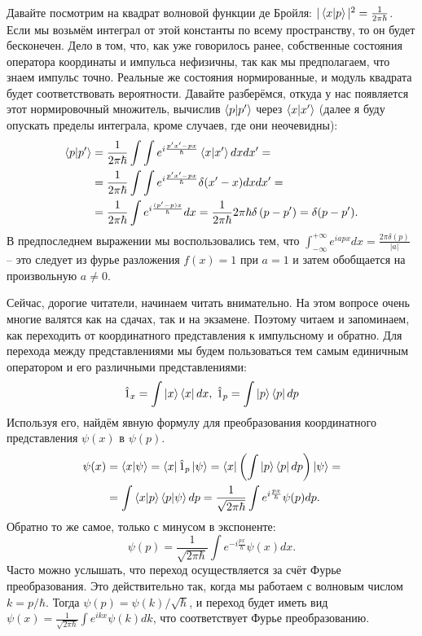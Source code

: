 Давайте посмотрим на квадрат волновой функции де Бройля: $|\bra{x} \ket{p}|^2 = \frac{1}{2 \pi \hbar}$. Если мы возьмём интеграл от этой константы по всему пространству, то он будет бесконечен. Дело в том, что, как уже говорилось ранее, собственные состояния оператора координаты и импульса нефизичны, так как мы предполагаем, что знаем импульс точно. Реальные же состояния нормированные, и модуль квадрата будет соответствовать вероятности. Давайте разберёмся, откуда у нас появляется этот нормировочный множитель, вычислив $\bra{p}\ket{p'}$ через $\bra{x}\ket{x'}$ (далее я буду опускать пределы интеграла, кроме случаев, где они неочевидны):
\begin{align*}
    \bra{p} \ket{p'} &= \frac{1}{2 \pi \hbar} \int \int e^{i \frac{p'x' - px}{\hbar}} \bra{x} \ket{x'} dx dx' = \\
    &= \frac{1}{2 \pi \hbar} \int \int e^{i \frac{p'x' - px}{\hbar}} \delta(x' - x) dx dx' =\\ 
    &= \frac{1}{2 \pi \hbar}\int e^{i \frac{(p' - p) x}{\hbar}}dx = \frac{1}{2 \pi \hbar} 2 \pi \hbar \delta\left(p - p'\right) = \delta(p - p').
\end{align*}
В предпоследнем выражении мы воспользовались тем, что $\int_{-\infty}^{+\infty} e^{iapx} dx = \frac{2 \pi \delta(p)}{|a|}$ -- это следует из фурье разложения $f(x) = 1$ при $a=1$ и затем обобщается на произвольную $a\neq 0$.

Сейчас, дорогие читатели, начинаем читать внимательно. На этом вопросе очень многие валятся как на сдачах, так и на экзамене. Поэтому читаем и запоминаем, как переходить от координатного представления к импульсному и обратно. Для перехода между представлениями мы будем пользоваться тем самым единичным оператором и его различными представлениями:
\[
\hat{1}_x = \int \ket{x} \bra{x} dx, \; \hat{1}_p = \int \ket{p} \bra{p} dp
\]
Используя его, найдём явную формулу для преобразования координатного представления $\psi(x)$ в $\psi(p)$.
\begin{align*}
    \psi(x) &= \bra{x} \ket{\psi} = \bra{x} \hat{1}_p \ket{\psi} = \bra{x} \left( \int \ket{p} \bra{p} dp \right) \ket{\psi} = \\
    &= \int \bra{x} \ket{p} \bra{p} \ket{\psi} dp = \frac{1}{\sqrt{2 \pi \hbar}} \int e^{i \frac{p x}{\hbar}} \psi(p) dp.
\end{align*}
Обратно то же самое, только с минусом в экспоненте:
\[
\psi(p) = \frac{1}{\sqrt{2 \pi \hbar}} \int e^{-i \frac{p x}{\hbar}} \psi(x) dx.
\]
Часто можно услышать, что переход осуществляется за счёт Фурье преобразования. Это действительно так, когда мы работаем с волновым числом $k=p/\hbar$. Тогда $\psi(p) = \psi(k)/\sqrt{\hbar}$, и переход будет иметь вид $\psi(x) = \frac{1}{\sqrt{2 \pi \hbar}}\int e^{i k x}\psi(k) dk$, что соответствует Фурье преобразованию. 

